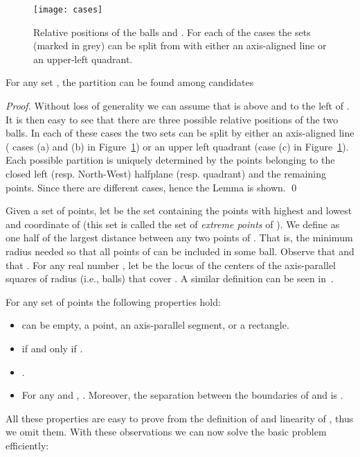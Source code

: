\documentclass{llncs}
\begin{document}
\begin{figure}[h]
    \centering
    \texttt{[image: cases]}
    \caption{\small{Relative positions of the balls  and . For each of the cases the sets  (marked in grey) can be split from  with either an axis-aligned line or an upper-left quadrant.}}
    \label{fig:cases}
\end{figure}
\begin{lemma}\label{lem_key}
For any set , the partition  can be found among  candidates
\end{lemma}
\begin{proof}
Without loss of generality we can assume that  is above and to the left of . It is then easy to see that there are three possible relative positions of the two balls. In each of these cases the two sets can be split by either an axis-aligned line ( cases (a) and (b) in Figure~\ref{fig:cases}) or an upper left quadrant (case (c) in  Figure~\ref{fig:cases}).
Each possible partition is uniquely determined by the points belonging to the closed left (resp. North-West) halfplane (resp. quadrant)  and the remaining points.
Since there are  different cases, hence the Lemma is shown.
\qed


\end{proof}

Given a set  of points, let   be the set containing the points with highest and lowest  and  coordinate of  (this set is called the set of {\em extreme points} of ). We define  as one half of the largest  distance between any two points of . That is, the  minimum radius needed so that all points of  can be included in some  ball. Observe that  and that .  For any real number , let  be the locus of the centers of the axis-parallel squares of radius  (i.e.,  balls) that cover . A similar definition can be seen in~\cite{huang03}.

\begin{lemma}\label{lem_propcen}
For any set  of points the following properties hold:
\begin{itemize}
    \item  can be empty, a point, an axis-parallel segment, or a rectangle.
    \item  if and only if .
    \item . \item For any  and , . Moreover, the separation between the boundaries of  and  is  .
\end{itemize}
\end{lemma}
All these properties are easy to prove from the definition of  and linearity of , thus we omit them. With these observations we can now solve the basic problem efficiently:
\end{document}
